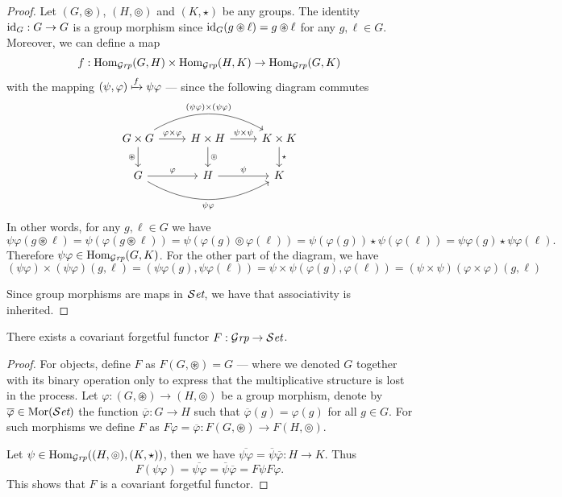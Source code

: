 \begin{proof}
  Let \((G, \circledast)\), \((H, \circledcirc)\) and \((K, \star)\) be any
  groups. The identity \(\operatorname{id}_G: G \to G\) is a group morphism since \(\operatorname{id}_G(g
  \circledast \ell) = g \circledast \ell\) for any \(g, \ell \in G\). Moreover,
  we can define a map
  \[
    f: \operatorname{Hom}_{{\mathcal{G}\textit{rp}}}(G, H) \times \operatorname{Hom}_{{\mathcal{G}\textit{rp}}}(H, K) \to \operatorname{Hom}_{{\mathcal{G}\textit{rp}}}(G, K)
  \]
  with the mapping \((\psi, \varphi) \xmapsto f \psi \varphi\) --- since
  the following diagram commutes
  \[
    \begin{tikzcd}
      G \times G \ar[r, "\varphi \times \varphi"]
      \ar[d, swap, "\circledast"]
      \ar[rr, bend left, "(\psi \varphi) \times (\psi \varphi)"]
      &H \times H \ar[r, "\psi \times \psi"]
      \ar[d, "\circledcirc"]
      &K \times K \ar[d, "\star"]
      \\
      G \ar[r, "\varphi"]
      \ar[rr, bend right, swap, "\psi \varphi"]
      &H \ar[r, "\psi"] &K
    \end{tikzcd}
  \]
  In other words, for any \(g, \ell \in G\) we have
  \[
    \psi \varphi (g \circledast \ell)
    = \psi(\varphi(g \circledast \ell))
    = \psi(\varphi(g) \circledcirc \varphi(\ell))
    = \psi(\varphi(g)) \star \psi(\varphi(\ell))
    = \psi \varphi(g) \star \psi \varphi(\ell).
  \]
  Therefore \(\psi \varphi \in \operatorname{Hom}_{\mathcal{G}\textit{rp}}(G, K)\). For the other part of the
  diagram, we have
  \[
    (\psi \varphi) \times (\psi \varphi) (g, \ell)
    = (\psi \varphi(g), \psi \varphi(\ell))
    = \psi \times \psi(\varphi(g), \varphi(\ell))
    =(\psi \times \psi) (\varphi \times \varphi) (g, \ell)
  \]

  Since group morphisms are maps in \({\mathcal{S}\textit{et}}\), we have that associativity is
  inherited.
\end{proof}

\begin{proposition}\label{prop: forgetful-func-grp-set}
  There exists a covariant forgetful functor \(F: {\mathcal{G}\textit{rp}} \to {\mathcal{S}\textit{et}}\).
\end{proposition}

\begin{proof}
  For objects, define \(F\) as \(F(G, \circledast) = G\) --- where we denoted
  \(G\) together with its binary operation only to express that the
  multiplicative structure is lost in the process. Let \(\varphi: (G,
  \circledast) \to (H, \circledcirc)\) be a group morphism, denote by
  \(\overline \varphi \in \operatorname{Mor}({\mathcal{S}\textit{et}})\) the function \(\overline\varphi: G \to
  H\) such that \(\overline\varphi(g) = \varphi(g)\) for all \(g \in G\). For
  such morphisms we define \(F\) as \(F\varphi = \overline\varphi: F(G,
  \circledast) \to F(H, \circledcirc)\).

  Let \(\psi \in \operatorname{Hom}_{\mathcal{G}\textit{rp}}((H, \circledcirc), (K, \star))\), then we have
  \(\overline{\psi \varphi} = \overline \psi \overline \varphi: H \to K\). Thus
  \[
    F(\psi \varphi) = \overline{\psi \varphi}
    = \overline \psi \overline \varphi = F\psi F\varphi.
  \]
  This shows that \(F\) is a covariant forgetful functor.
\end{proof}

